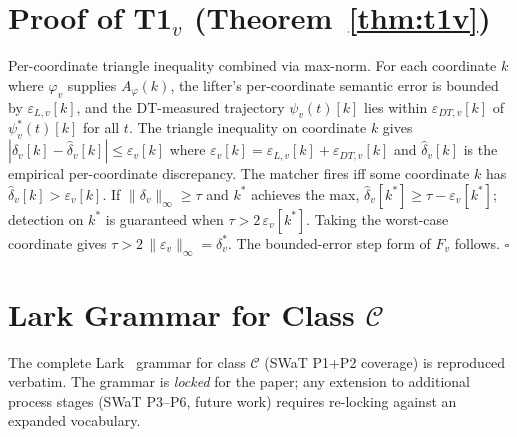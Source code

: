 
\appendices

\section{Proof of T1${}_v$ (Theorem~\ref{thm:t1v})}
\label{app:t1v-proof}

Per-coordinate triangle inequality combined via max-norm. For each
coordinate $k$ where $\varphi_v$ supplies $A_\varphi(k)$, the lifter's
per-coordinate semantic error is bounded by $\varepsilon_{L,v}[k]$,
and the DT-measured trajectory $\psi_v(t)[k]$ lies within
$\varepsilon_{DT,v}[k]$ of $\psi_v^{*}(t)[k]$ for all $t$. The
triangle inequality on coordinate $k$ gives $|\delta_v[k] -
\hat\delta_v[k]| \leq \varepsilon_v[k]$ where $\varepsilon_v[k] =
\varepsilon_{L,v}[k] + \varepsilon_{DT,v}[k]$ and $\hat\delta_v[k]$ is
the empirical per-coordinate discrepancy. The matcher fires iff some
coordinate $k$ has $\hat\delta_v[k] > \varepsilon_v[k]$. If
$\|\delta_v\|_\infty \geq \tau$ and $k^{*}$ achieves the max,
$\hat\delta_v[k^{*}] \geq \tau - \varepsilon_v[k^{*}]$; detection on
$k^{*}$ is guaranteed when $\tau > 2\,\varepsilon_v[k^{*}]$. Taking
the worst-case coordinate gives $\tau > 2\,\|\varepsilon_v\|_\infty
= \delta^{*}_v$. The bounded-error step form of $F_v$ follows.
\hfill$\square$

\section{Lark Grammar for Class $\mathcal{C}$}
\label{app:grammar}

The complete Lark~\cite{minicps} grammar for class $\mathcal{C}$
(SWaT P1+P2 coverage) is reproduced verbatim. The grammar is
\emph{locked} for the paper; any extension to additional process
stages (SWaT P3--P6, future work) requires re-locking against an
expanded vocabulary.

